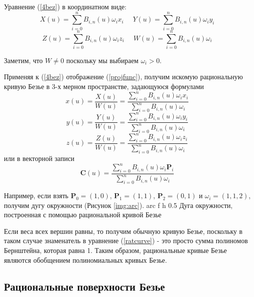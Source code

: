 \documentclass{bmstu}
\begin{document}
Уравнение (\ref{4bez}) в координатном виде:
\begin{equation*}
    X(u) = \sum\limits_{i=0}^nB_{i,n}(u)\omega_ix_i~~~~~~ Y(u) = \sum\limits_{i=0}^nB_{i,n}(u)\omega_iy_i
\end{equation*}
\begin{equation*}
    Z(u) = \sum\limits_{i=0}^nB_{i,n}(u)\omega_iz_i~~~~~~ W(u) = \sum\limits_{i=0}^nB_{i,n}(u)\omega_i
\end{equation*}

Заметим, что $W \neq 0$ поскольку мы выбираем $\omega_i > 0$.

Применяя к (\ref{4bez}) отображение (\ref{projfunc}), получим искомую рациональную кривую Безье в 3-х мерном пространстве, задающуюся формулами
\[
    x(u) = \frac{X(u)}{W(u)}= \frac{\sum\limits_{i=0}^nB_{i,n}(u)\omega_ix_i}{\sum\limits_{i=0}^nB_{i,n}(u)\omega_i}
\]
\[
    y(u) = \frac{Y(u)}{W(u)}= \frac{\sum\limits_{i=0}^nB_{i,n}(u)\omega_iy_i}{\sum\limits_{i=0}^nB_{i,n}(u)\omega_i}
\]
\[
    z(u) = \frac{Z(u)}{W(u)}= \frac{\sum\limits_{i=0}^nB_{i,n}(u)\omega_iz_i}{\sum\limits_{i=0}^nB_{i,n}(u)\omega_i}
\]
или в векторной записи
\begin{equation}\label{ratcurve}
    \mathbf{C}(u) = \frac{\sum\limits_{i=0}^nB_{i,n}(u)\omega_i\mathbf{P}_i}{\sum\limits_{i=0}^nB_{i,n}(u)\omega_i}
\end{equation}



Например, если взять $\mathbf{P}_0 = (1,0)$, $\mathbf{P}_1 = (1,1)$, $\mathbf{P}_2 = (0,1)$ и $\omega_i = (1, 1, 2)$, получим дугу окружности (Рисунок \ref{img:arc}).
{arc} %
{f} %
{h} %
{0.5\textwidth} %
{Дуга окружности, построенная с помощью рациональной кривой Безье} %

Если веса всех вершин равны, то получим обычную кривую Безье, поскольку в таком случае знаменатель в уравнение (\ref{ratcurve}) - это просто сумма полиномов Бернштейна, которая равна 1. Таким образом, рациональные кривые Безье являются обобщением полиномиальных кривых Безье.
\subsection{Рациональные поверхности Безье}
\end{document}
